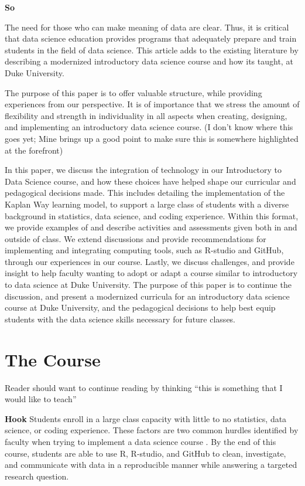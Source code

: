 \documentclass[
  12pt]{article}
\begin{document}
\textbf{So}

The need for those who can make meaning of data are clear. Thus, it is
critical that data science education provides programs that adequately
prepare and train students in the field of data science. This article
adds to the existing literature by describing a modernized introductory
data science course and how its taught, at Duke University.

The purpose of this paper is to offer valuable structure, while
providing experiences from our perspective. It is of importance that we
stress the amount of flexibility and strength in individuality in all
aspects when creating, designing, and implementing an introductory data
science course. (I don't know where this goes yet; Mine brings up a good
point to make sure this is somewhere highlighted at the forefront)

In this paper, we discuss the integration of technology in our
Introductory to Data Science course, and how these choices have helped
shape our curricular and pedagogical decisions made. This includes
detailing the implementation of the Kaplan Way learning model, to
support a large class of students with a diverse background in
statistics, data science, and coding experience. Within this format, we
provide examples of and describe activities and assessments given both
in and outside of class. We extend discussions and provide
recommendations for implementing and integrating computing tools, such
as R-studio and GitHub, through our experiences in our course. Lastly,
we discuss challenges, and provide insight to help faculty wanting to
adopt or adapt a course similar to introductory to data science at Duke
University. The purpose of this paper is to continue the discussion, and
present a modernized curricula for an introductory data science course
at Duke University, and the pedagogical decisions to help best equip
students with the data science skills necessary for future classes.

\hypertarget{sec-course}{%
\section{The Course}\label{sec-course}}

Reader should want to continue reading by thinking ``this is something
that I would like to teach''

\textbf{Hook} Students enroll in a large class capacity with little to
no statistics, data science, or coding experience. These factors are two
common hurdles identified by faculty when trying to implement a data
science course \citep{Schwab2020, Kok_2008}. By the end of this course,
students are able to use R, R-studio, and GitHub to clean, investigate,
and communicate with data in a reproducible manner while answering a
targeted research question.
\end{document}
